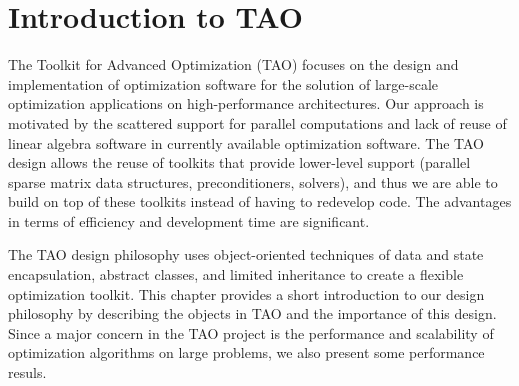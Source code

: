 \chapter{Introduction to TAO}
\label{chapter:introduction}


The Toolkit for Advanced Optimization (TAO) focuses on the design and
implementation of optimization software for the
solution of large-scale optimization applications on high-performance
architectures.  Our approach is motivated by the scattered support for
parallel computations and lack of reuse of linear algebra software in
currently available optimization software.  The TAO design allows the
reuse of toolkits that provide lower-level support (parallel sparse
matrix data structures, preconditioners, solvers), and thus we are
able to build on top of these toolkits instead of having to redevelop
code. The advantages in terms of efficiency and development time are
significant.

The TAO design philosophy uses object-oriented techniques of data and
state encapsulation, abstract classes, and limited inheritance to
create a flexible optimization toolkit.  This chapter provides a short
introduction to our design philosophy by describing the objects in TAO
and the importance of this design.  Since a major concern in the TAO
project is the performance and scalability of optimization algorithms
on large problems, we also present some performance resuls.

